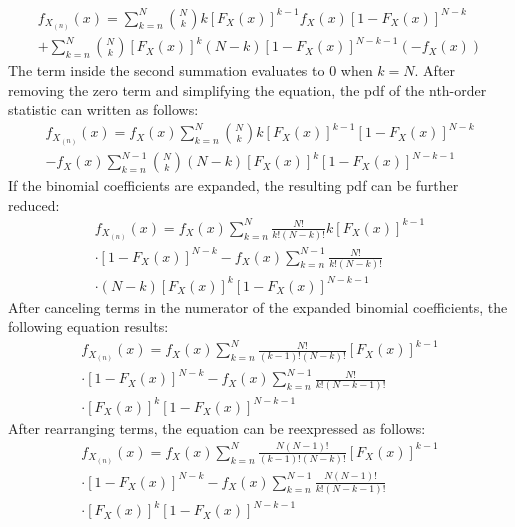\documentclass[conference]{IEEEtran}
\begin{document}
\begin{equation}
\begin{gathered}
f_{X_{(n)}}(x) = \sum_{k=n}^{N}\binom{N}{k}k[F_X(x)]^{k-1}f_X(x)[1-F_X(x)]^{N-k}\\
 + \sum_{k=n}^{N}\binom{N}{k}[F_X(x)]^{k}(N-k)[1-F_X(x)]^{N-k-1}(-f_X(x))
\end{gathered}
\end{equation}
The term inside the second summation evaluates to 0 when $k=N$. After removing the zero term and simplifying the equation, the pdf of the nth-order statistic can written as follows:
\begin{equation}
\begin{gathered}
f_{X_{(n)}}(x) = f_X(x)\sum_{k=n}^{N}\binom{N}{k}k[F_X(x)]^{k-1}[1-F_X(x)]^{N-k}\\
- f_X(x)\sum_{k=n}^{N-1}\binom{N}{k}(N-k)[F_X(x)]^{k}[1-F_X(x)]^{N-k-1}
\end{gathered}
\end{equation}
If the binomial coefficients are expanded, the resulting pdf can be further reduced:
\begin{equation}
\begin{gathered}
f_{X_{(n)}}(x) = f_X(x)\sum_{k=n}^{N}\frac{N!}{k!(N-k)!}k[F_X(x)]^{k-1}\\
\cdot[1-F_X(x)]^{N-k} - f_X(x)\sum_{k=n}^{N-1}\frac{N!}{k!(N-k)!}\\
\cdot(N-k)[F_X(x)]^{k}[1-F_X(x)]^{N-k-1}
\end{gathered}
\end{equation}
After canceling terms in the numerator of the expanded binomial coefficients, the following equation results:
\begin{equation}
\begin{gathered}
f_{X_{(n)}}(x) = f_X(x)\sum_{k=n}^{N}\frac{N!}{(k-1)!(N-k)!}[F_X(x)]^{k-1}\\
\cdot[1-F_X(x)]^{N-k} - f_X(x)\sum_{k=n}^{N-1}\frac{N!}{k!(N-k-1)!}\\
\cdot[F_X(x)]^{k}[1-F_X(x)]^{N-k-1}
\end{gathered}
\end{equation}
After rearranging terms, the equation can be reexpressed as follows:
\begin{equation}
\begin{gathered}
f_{X_{(n)}}(x) = f_X(x)\sum_{k=n}^{N}\frac{N(N-1)!}{(k-1)!(N-k)!}[F_X(x)]^{k-1}\\
\cdot[1-F_X(x)]^{N-k} - f_X(x)\sum_{k=n}^{N-1}\frac{N(N-1)!}{k!(N-k-1)!}\\
\cdot[F_X(x)]^{k}[1-F_X(x)]^{N-k-1}
\end{gathered}
\end{equation}
\end{document}
